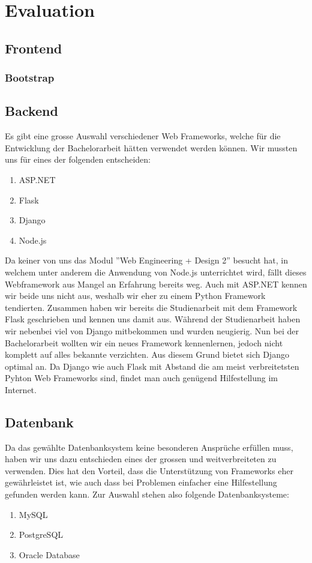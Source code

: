 \section{Evaluation}
\subsection{Frontend}
\subsubsection{Bootstrap}


\subsection{Backend}
Es gibt eine grosse Auswahl verschiedener Web Frameworks, welche für die Entwicklung der Bachelorarbeit hätten verwendet werden können. Wir mussten uns für eines der folgenden entscheiden:
\begin{enumerate}
	\item ASP.NET
	\item Flask
	\item Django
	\item Node.js
\end{enumerate}

\noindent Da keiner von uns das Modul ''Web Engineering + Design 2'' besucht hat, in welchem unter anderem die Anwendung von Node.js unterrichtet wird, fällt dieses Webframework aus Mangel an Erfahrung bereits weg. Auch mit ASP.NET kennen wir beide uns nicht aus, weshalb wir eher zu einem Python Framework tendierten. Zusammen haben wir bereits die Studienarbeit mit dem Framework Flask geschrieben und kennen uns damit aus. Während der Studienarbeit haben wir nebenbei viel von Django mitbekommen und wurden neugierig. Nun bei der Bachelorarbeit wollten wir ein neues Framework kennenlernen, jedoch nicht komplett auf alles bekannte verzichten. Aus diesem Grund bietet sich Django optimal an. Da Django wie auch Flask mit Abstand die am meist verbreitetsten Pyhton Web Frameworks sind, findet man auch genügend Hilfestellung im Internet.


\subsection{Datenbank}
Da das gewählte Datenbanksystem keine besonderen Ansprüche erfüllen muss, haben wir uns dazu entschieden eines der grossen und weitverbreiteten zu verwenden. Dies hat den Vorteil, dass die Unterstützung von Frameworks eher gewährleistet ist, wie auch dass bei Problemen einfacher eine Hilfestellung gefunden werden kann. 
Zur Auswahl stehen also folgende Datenbanksysteme:
\begin{enumerate}
	\item MySQL
	\item PostgreSQL
	\item Oracle Database
\end{enumerate}

